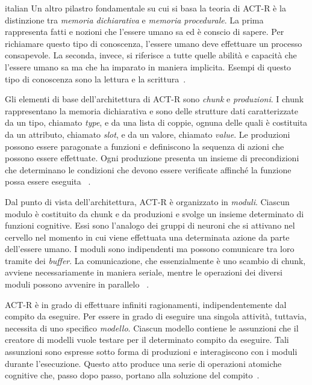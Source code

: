 \begin{otherlanguage*}{italian}
				Un altro pilastro fondamentale su cui si basa la teoria di \mbox{ACT-R} è la distinzione tra \emph{memoria dichiarativa} e \emph{memoria procedurale}. La prima rappresenta fatti e nozioni che l'essere umano sa ed è conscio di sapere. Per richiamare questo tipo di conoscenza, l'essere umano deve effettuare un processo consapevole. La seconda, invece, si riferisce a tutte quelle abilità e capacità che l'essere umano sa ma che ha imparato in maniera implicita. Esempi di questo tipo di conoscenza sono la lettura e la scrittura~\cite{anderson1976language}. 

				Gli elementi di base dell'architettura di \mbox{ACT-R} sono \emph{chunk} e \emph{produzioni}.
				I chunk rappresentano la memoria dichiarativa e sono delle strutture dati caratterizzate da un tipo, chiamato \emph{type}, e da una lista di coppie, ognuna delle quali è costituita da un attributo, chiamato \emph{slot}, e da un valore, chiamato \emph{value}.
				Le produzioni possono essere paragonate a funzioni e definiscono la sequenza di azioni che possono essere effettuate.
				Ogni produzione presenta un insieme di precondizioni che determinano le condizioni che devono essere verificate affinché la funzione possa essere eseguita ~\cite{actr6refman}.

				Dal punto di vista dell'architettura, \mbox{ACT-R} è organizzato in \emph{moduli}.
				Ciascun modulo è costituito da chunk e da produzioni e svolge un insieme determinato di funzioni cognitive. 
				Essi sono l'analogo dei gruppi di neuroni che si attivano nel cervello nel momento in cui viene effettuata una determinata azione da parte dell'essere umano.
				I moduli sono indipendenti ma possono comunicare tra loro tramite dei \emph{buffer}. 
				La comunicazione, che essenzialmente è uno scambio di chunk, avviene necessariamente in maniera seriale, mentre le operazioni dei diversi moduli possono avvenire in parallelo ~\cite{actr6refman}.
				
				\mbox{ACT-R} è in grado di effettuare infiniti ragionamenti, indipendentemente dal compito da eseguire. 
				Per essere in grado di eseguire una singola attività, tuttavia, necessita di uno specifico \emph{modello}.
				Ciascun modello contiene le assunzioni che il creatore di modelli vuole testare per il determinato compito da eseguire.
				Tali assunzioni sono espresse sotto forma di produzioni e interagiscono con i moduli durante l'esecuzione.
				Questo atto produce una serie di operazioni atomiche cognitive che, passo dopo passo, portano alla soluzione del compito~\cite{Sears2012}. 
				

\end{otherlanguage*}
